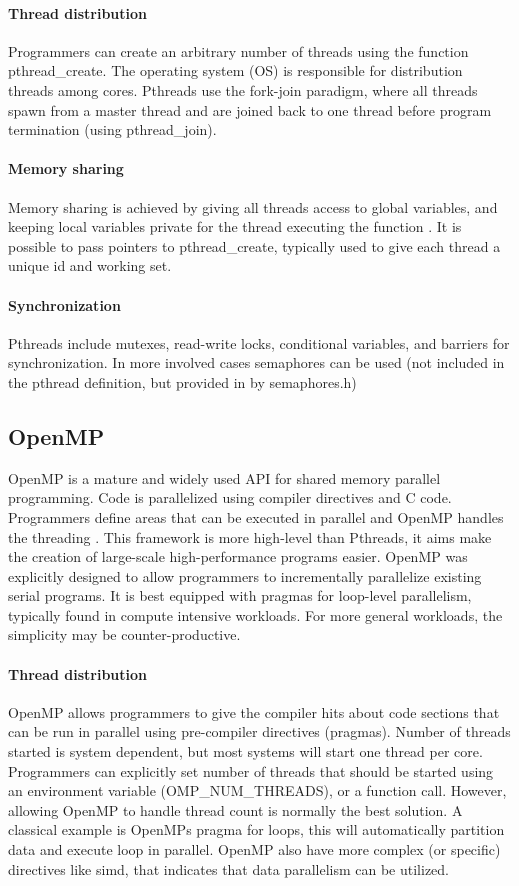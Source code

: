 \paragraph{Thread distribution} Programmers can create an arbitrary
number of threads using the function pthread\_create. The operating
system (OS) is responsible for distribution threads among cores.
Pthreads use the fork-join paradigm, where all threads spawn from a
master thread and are joined back to one thread before program
termination (using pthread\_join).

\paragraph{Memory sharing} Memory sharing is achieved by giving all threads access to global
variables, and keeping local variables private for the thread
executing the function \cite{pacheco}. It is possible to pass pointers
to pthread\_create, typically used to give each thread a unique id and
working set.

\paragraph{Synchronization}
Pthreads include mutexes, read-write locks, conditional variables, and
barriers for synchronization. In more involved cases semaphores can be
used (not included in the pthread definition, but provided in by
semaphores.h)

\subsection{OpenMP}

OpenMP is a mature and widely used API for shared memory parallel
programming. Code is parallelized using compiler directives and C
code. Programmers define areas that can be executed in parallel and
OpenMP handles the threading \cite{pacheco}. This framework is more
high-level than Pthreads, it aims make the creation of large-scale
high-performance programs easier. OpenMP was explicitly designed to
allow programmers to incrementally parallelize existing serial
programs. It is best equipped with pragmas for loop-level parallelism,
typically found in compute intensive workloads. For more general
workloads, the simplicity may be counter-productive.

\paragraph{Thread distribution} OpenMP allows programmers to give the
compiler hits about code sections that can be run in parallel using
pre-compiler directives (pragmas). Number of threads started is system
dependent, but most systems will start one thread per core.
Programmers can explicitly set number of threads that should be
started using an environment variable (OMP\_NUM\_THREADS), or a
function call. However, allowing OpenMP to handle thread count is
normally the best solution. A classical example is OpenMPs pragma for
loops, this will automatically partition data and execute loop in
parallel. OpenMP also have more complex (or specific) directives like
simd, that indicates that data parallelism can be utilized.

